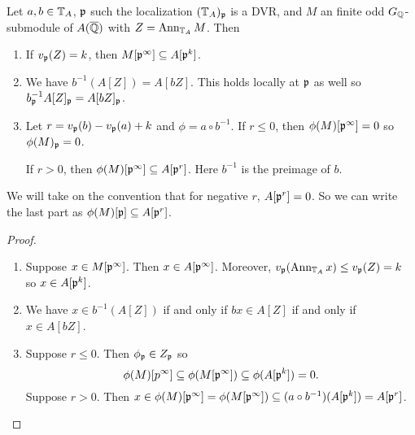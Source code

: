 \documentclass[11pt, proquest]{uwthesis}
\begin{document}
\begin{lemma}\label{lem:com_alg}
    Let $a,b\in \mathbb{T}_A$, $\mathfrak{p}$ such the localization $(\mathbb{T}_A)_{\mathfrak{p}}$ is a DVR, and
    $M$ an finite odd $G_{\mathbb{Q}}$-submodule of $A(\overline{\mathbb{Q}})$ with $Z=\operatorname{Ann}_{\mathbb{T}_A} M$.
    Then
    \begin{enumerate}
        \item
            If $v_{\mathfrak{p}}(Z) = k$, then $M[\mathfrak{p}^\infty]\subseteq A[\mathfrak{p}^k]$.
        \item
            We have $b^{-1}(A[Z])=A[bZ]$. This holds locally at $\mathfrak{p}$ as well so
            $b_{\mathfrak{p}} ^{-1} A[Z]_{\mathfrak{p}} = A[bZ]_{\mathfrak{p}}$.
        \item
            Let $r=v_{\mathfrak{p}}(b)-v_{\mathfrak{p}}(a)+k$ and $\phi=a\circ b^{-1}$. If $r\leq
            0$, then $\phi(M)[\mathfrak{p}^\infty]=0$ so $\phi(M)_{\mathfrak{p}}=0$.

            If $r>0$, then
            $\phi(M)[\mathfrak{p}^\infty]\subseteq A[\mathfrak{p}^r]$. Here $b^{-1}$ is the
            preimage of $b$.
    \end{enumerate}
    We will take on the convention that for negative $r$, $A[\mathfrak{p}^r]=0$. So we can
    write the last part as $\phi(M)[\mathfrak{p}]\subseteq A[\mathfrak{p}^r]$.
\end{lemma}
\begin{proof}
    \mbox{}
    \begin{enumerate}
        \item
            Suppose $x\in M[\mathfrak{p}^\infty]$. Then $x\in A[\mathfrak{p}^\infty]$. Moreover,
            $v_{\mathfrak{p}}(\operatorname{Ann}_{\mathbb{T}_A} x) \leq v_{\mathfrak{p}}(Z) = k$ so $x\in A[\mathfrak{p}^k]$.
        \item
            We have $x\in b^{-1}(A[Z])$ if and only if $bx \in A[Z]$ if and
            only if $x\in A[bZ]$.
        \item
            Suppose $r\leq 0$. Then $\phi_{\mathfrak{p}} \in Z_{\mathfrak{p}}$ so
            \[
                \phi(M)[p^\infty]\subseteq \phi(M[\mathfrak{p}^\infty])
                \subseteq \phi(A[\mathfrak{p}^k]) = 0.
            \]
            Suppose $r>0$. Then $x\in \phi(M)[\mathfrak{p}^\infty] =
            \phi(M[\mathfrak{p}^\infty])\subseteq (a\circ
            b^{-1})(A[\mathfrak{p}^k])=A[\mathfrak{p}^r]$.
    \end{enumerate}
\end{proof}
\end{document}
